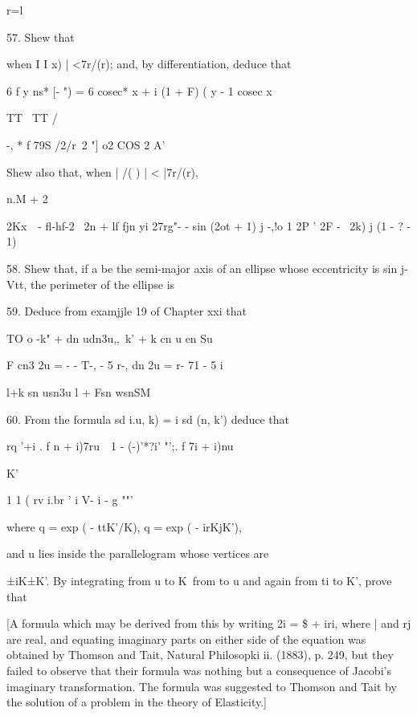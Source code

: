 r=l


%
%

57. Shew that

when I I x) | <7r/(r); and, by differentiation, deduce that

6 f y ns* [- ") = 6 cosec* x + i (1 + F) ( y - 1 cosec x

TT \ TT /

 -, * f 79S /2/r\ 2 "] o2 COS 2 A'

Shew also that, when | /( ) | < |7r/(r),

n.M + 2

2Kx\ \ - fl-hf-2 \ 2n + lf fjn yi 27rg"- - sin (2ot + 1) j -,!o 1 2P
' 2F - \ 2k) j (1 - ? - 1) 


58. Shew that, if a be the semi-major axis of an ellipse whose
eccentricity is sin j-Vtt, the perimeter of the ellipse is


59. Deduce from examjjle 19 of Chapter xxi that

TO o -k" + dn udn3u,,\ k' + k cn u en Su

F cn3 2u = - - T-, - 5 r-, dn 2u = r- 71 - 5 i~ 

l+k sn usn3u l + Fsn wsnSM


60. From the formula sd i.u, k) = i sd (n, k') deduce that

rq '+i . f n + i)7ru\ \ 1 - (-)'*?i' "';. f 7i + i)nu

K'

1 1 ( rv i.br ' i V- i - g ""'

where q = exp ( - ttK'/K), q = exp ( - irKjK'),

and u lies inside the parallelogram whose vertices are

±iK±K'. By integrating from u to K\ from to u and again from ti to K',
prove that

[A formula which may be derived from this by writing 2i = \$ + iri,
where | and rj are real, and equating imaginary parts on either side
of the equation was obtained by Thomson and Tait, Natural Philosopki
ii. (1883), p. 249, but they failed to observe that their formula was
nothing but a consequence of Jacobi's imaginary transformation. The
formula was suggested to Thomson and Tait by the solution of a problem
in the theory of Elasticity.]

